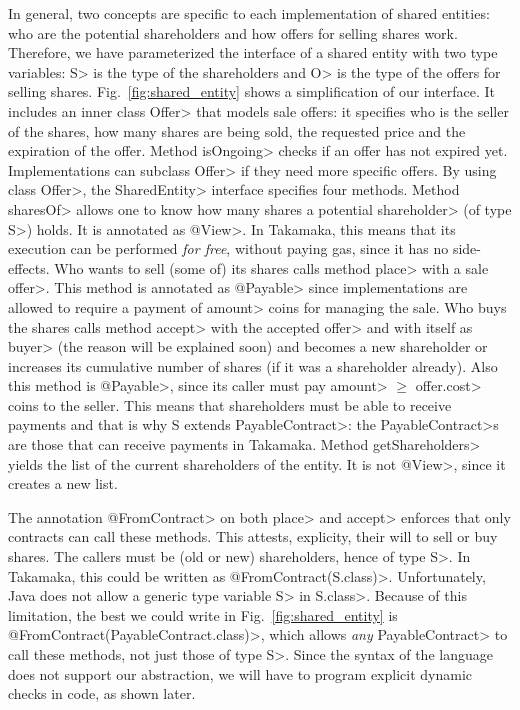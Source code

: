In general, two concepts are specific to each implementation of shared entities:
who are the potential shareholders and how offers for selling shares work.
Therefore, we have parameterized the interface of a shared entity with two type variables:
\<S> is the type of the shareholders and \<O> is the type of the offers for selling shares.
Fig.~\ref{fig:shared_entity} shows a simplification of our interface.
It includes an inner class \<Offer> that models sale offers:
it specifies who is the seller of the shares,
how many shares are being sold, the requested price and the expiration of the offer.
Method \<isOngoing> checks if an offer has not expired yet.
Implementations can subclass \<Offer> if they need more specific offers.
By using class \<Offer>, the \<SharedEntity> interface specifies four methods.
Method \<sharesOf> allows one to know how many shares a potential \<shareholder> (of type \<S>) holds.
It is annotated as \<@View>. In Takamaka, this means that its execution can be performed
\emph{for free}, without paying gas, since it has no side-effects. Who wants to sell
(some of) its shares calls method \<place> with a sale \<offer>.
This method is annotated as \<@Payable> since
implementations are allowed to require a payment of \<amount> coins for managing the sale.
Who buys the shares calls method \<accept> with the accepted \<offer>
and with itself as \<buyer> (the reason will be explained soon)
and becomes a new shareholder or increases
its cumulative number of shares (if it was a shareholder already).
Also this method is \<@Payable>, since its caller must pay \<amount> $\ge$ \<offer.cost>
coins to the seller.
This means that shareholders must be able to receive payments and that
is why \<S extends PayableContract>: the \<PayableContract>s are those that can receive
payments in Takamaka.
Method \<getShareholders> yields the list of the current shareholders of the entity.
It is not \<@View>, since it creates a new list.

The annotation \<@FromContract> on both \<place> and \<accept> enforces that only
contracts can call these methods. This attests, explicity, their will
to sell or buy shares. The callers must be (old or new) shareholders,
hence of type \<S>. In Takamaka, this could be written
as \<@FromContract(S.class)>. Unfortunately, Java does not allow a generic type variable \<S>
in \<S.class>. Because of this limitation,
the best we could write in Fig.~\ref{fig:shared_entity} is \<@FromContract(PayableContract.class)>,
which allows \emph{any} \<PayableContract> to call these methods, not just those of type \<S>.
Since the syntax of the language does not support our abstraction, we will have to
program explicit dynamic checks in code, as shown later.

